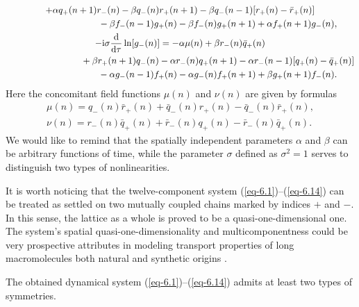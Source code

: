 \documentclass[10pt,a4paper]{amsart}
\numberwithin{equation}{section}
\begin{document}
\begin{gather}
	 + \alpha q_{+}(n+1)r_{-}(n) - \beta q_{-}(n)r_{+}(n+1) - \beta q_{-}(n-1)[r_{+}(n)-\bar{r}_{+}(n)]\nonumber\\
 \hspace{0.25mm}\hphantom{+\mathrm{i}\sigma\frac{\mathrm{d}}{\mathrm{d}\tau}\ln[f_{-}(n)] =}{}
	 - \beta f_{-}(n-1)g_{+}(n) - \beta f_{-}(n)g_{+}(n+1) + \alpha f_{+}(n+1)g_{-}(n), \label{eq-6.11}
\\
	 -\mathrm{i}\sigma\frac{\mathrm{d}}{\mathrm{d}\tau}\ln[g_{-}(n)] = -\alpha \mu(n) + \beta r_{-}(n)\bar{q}_{+}(n)\nonumber\\
 \hspace{0.25mm}\hphantom{-\mathrm{i}\sigma\frac{\mathrm{d}}{\mathrm{d}\tau}\ln[g_{-}(n)] =}{}
	 + \beta r_{+}(n+1)q_{-}(n) - \alpha r_{-}(n)q_{+}(n+1) - \alpha r_{-}(n-1)[q_{+}(n)-\bar{q}_{+}(n)]\nonumber\\
 \hspace{0.25mm}\hphantom{-\mathrm{i}\sigma\frac{\mathrm{d}}{\mathrm{d}\tau}\ln[g_{-}(n)] =}{}
	 - \alpha g_{-}(n-1)f_{+}(n) - \alpha g_{-}(n)f_{+}(n+1) + \beta g_{+}(n+1)f_{-}(n) . \label{eq-6.12}
\end{gather}
Here the concomitant field functions $\mu(n)$ and $\nu(n)$ are given by formulas
\begin{gather}\label{eq-6.13}
	\mu(n) = q_{-}(n)\bar{r}_{+}(n)+\bar{q}_{-}(n)r_{+}(n)-\bar{q}_{-}(n)\bar{r}_{+}(n),
\\ \label{eq-6.14}
	\nu(n) = r_{-}(n)\bar{q}_{+}(n)+\bar{r}_{-}(n)q_{+}(n)-\bar{r}_{-}(n)\bar{q}_{+}(n) .
\end{gather}
We would like to remind that the spatially independent parameters $\alpha$ and $\beta$ can be arbitrary functions of time, while the parameter $\sigma$ defined as $\sigma^{2}=1$ serves to distinguish two types of nonlinearities.


It is worth noticing that the twelve-component system (\ref{eq-6.1})--(\ref{eq-6.14}) can be treated as settled on two mutually coupled chains marked by indices $+$ and $-$. In this sense, the lattice as a whole is proved to be a quasi-one-dimensional one. The system's spatial quasi-one-dimensionality and multicomponentness could be very prospective attributes in modeling transport properties of long macromolecules both natural and synthetic origins \cite{chen-AM-32-2001893, perepelytsya-EBJ-50-759, satchanska-PM-16-1159}.

The obtained dynamical system (\ref{eq-6.1})--(\ref{eq-6.14}) admits at least two types of symmetries.
\end{document}
